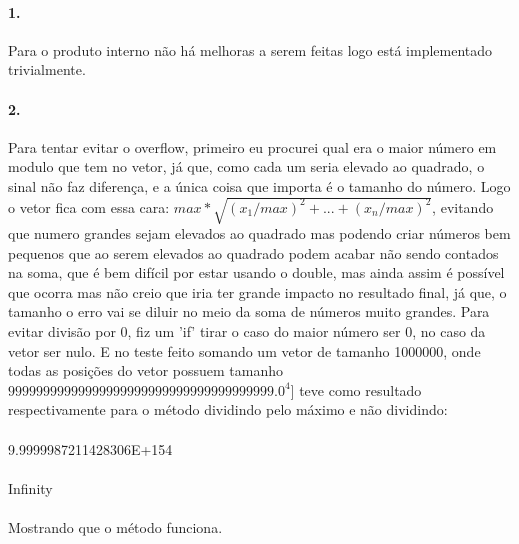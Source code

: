 \documentclass{article}
\begin{document}
	\paragraph{1.}Para o produto interno não há melhoras a serem feitas logo está implementado trivialmente.
	\paragraph{2.}
		Para tentar evitar o overflow, primeiro eu procurei qual era o maior número em modulo que tem no vetor, já que, como cada um seria elevado ao quadrado, o sinal não faz diferença, e a única coisa que importa é o tamanho do número. Logo o vetor fica com essa cara: $max*\sqrt{(x_{1}/max)^2 + ... + (x_{n}/max)^2}$, evitando que numero grandes sejam elevados ao quadrado mas podendo criar números bem pequenos que ao serem elevados ao quadrado podem acabar não sendo contados na soma, que é bem difícil por estar usando o double, mas ainda assim é possível que ocorra mas não creio que iria ter grande impacto no resultado final, já que, o tamanho o erro vai se diluir no meio da soma de números muito grandes.
		Para evitar divisão por 0, fiz um 'if' tirar o caso do maior número ser 0, no caso da vetor ser nulo.
		E no teste feito somando um vetor de tamanho 1000000, onde todas as posições do vetor possuem tamanho $99999999999999999999999999999999999999.0^{4}]$ teve como resultado respectivamente 
		para o método dividindo pelo máximo e não dividindo:
		\paragraph{}9.9999987211428306E+154
		\paragraph{}Infinity
		\paragraph{}Mostrando que o método funciona.
		
\end{document}
